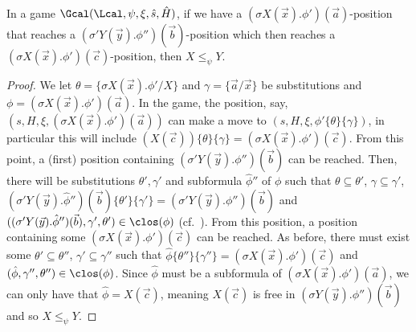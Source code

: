 \begin{lemma}\label{lem:parityNom2}
	In a game $\Gcal(\Lcal, \psi, \xi, \hat s, \hat H)$, 
	if we have a $(\sigma X(\vec x).\phi')(\vec a)$-position  that reaches a $(\sigma' Y(\vec y).\phi'')(\vec b)$-position which then reaches a $(\sigma X(\vec x).\phi')(\vec c)$-position, then $X \le_\psi Y$.  
\end{lemma}%
\begin{proof}
	We let $\theta = \{\sigma X(\vec x).\phi'/ X\}$ and $\gamma = \{\vec a/ \vec x\}$ be substitutions and $\phi=(\sigma X(\vec x).\phi')(\vec a)$.
	In the game, the position, say, $(s, H, \xi, (\sigma X(\vec x).\phi')(\vec a))$ can make a move to $(s, H, \xi, \phi'\{\theta\}\{\gamma\})$, in particular this will include $(X(\vec c))\{\theta\}\{\gamma\} = (\sigma X(\vec x).\phi')(\vec c)$. 
	From this point, a (first) position containing $(\sigma' Y(\vec y).\phi'')(\vec b)$ can be reached.
	Then, there will be substitutions $\theta', \gamma'$ and subformula $\hat\phi''$ of $\phi$ such that $\theta \subseteq \theta'$, $\gamma \subseteq \gamma'$,
	$(\sigma'Y(\vec y).\hat \phi'')(\vec b)\{\theta'\}\{\gamma'\} = (\sigma' Y(\vec y).\phi'')(\vec b)$
	and 
	$((\sigma' Y(\vec y).\hat\phi'')(\vec b), \gamma', \theta') \in \clos(\phi)$
	(cf.~).
	From this position, a position containing some $(\sigma X(\vec x).\phi')(\vec c)$ can be reached.
	As before,
	there must exist some $\theta' \subseteq \theta''$, $\gamma' \subseteq \gamma''$ 
	such that $\hat \phi\{\theta''\}\{\gamma''\} = (\sigma X(\vec x).\phi')(\vec c)$ and $(\hat \phi, \gamma'', \theta'') \in \clos(\phi)$. 
	Since $\hat \phi$ must be a subformula of $(\sigma X(\vec x).\phi')(\vec a)$, we can only have that $\hat \phi = X(\vec c)$, 
	meaning $X(\vec c)$ is free in $(\sigma Y(\vec y).\phi'')(\vec b)$ and so $X \le_\psi Y$.
\end{proof}

\FnomSatPar*

